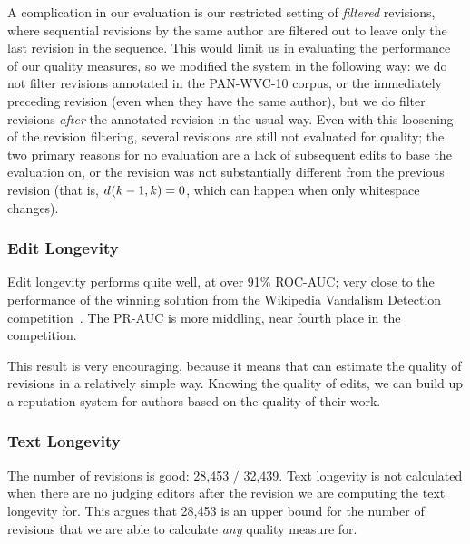 A complication in our evaluation is our restricted setting of
\textit{filtered} revisions, where sequential revisions by the
same author are filtered out to leave only the last revision
in the sequence.
This would limit us in evaluating the performance of our
quality measures, so we modified the system in the following way:
we do not filter revisions annotated in the PAN-WVC-10 corpus,
or the immediately preceding revision (even when they have the
same author), but we do filter revisions \textit{after} the annotated
revision in the usual way.
Even with this loosening of the revision filtering, several
revisions are still not evaluated for quality; the two
primary reasons for no evaluation are a lack of subsequent
edits to base the evaluation on, or the revision was not
substantially different from the previous revision
(that is, $d_{}(k-1,k) = 0$, which can happen when only
whitespace changes).

\subsubsection{Edit Longevity}

Edit longevity performs quite well, at over 91\% ROC-AUC;
very close to the performance of the winning solution from
the Wikipedia Vandalism Detection competition~\cite{Potthast2010b}.
The PR-AUC is more middling, near fourth place in the competition.

This result is very encouraging, because it means that can
estimate the quality of revisions in a relatively simple way.
Knowing the quality of edits, we can build up a reputation
system for authors based on the quality of their work.





\subsubsection{Text Longevity}

The number of revisions is good: 28,453 / 32,439.
Text longevity is not calculated when there are no
judging editors after the revision we are computing
the text longevity for.
This argues that 28,453 is an upper bound for the number
of revisions that we are able to calculate \textit{any}
quality measure for.

